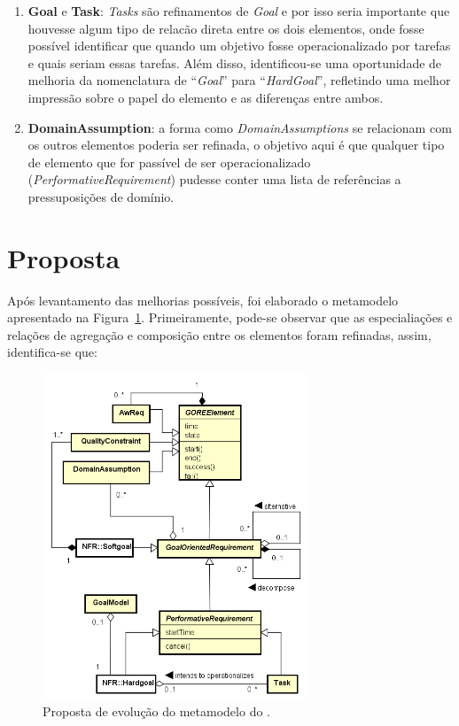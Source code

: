 \begin{enumerate}
	\item \textbf{Goal} e \textbf{Task}: \textit{Tasks} são refinamentos de \textit{Goal} e por isso seria importante que houvesse algum tipo de relacão direta entre os dois elementos, onde fosse possível identificar que quando um objetivo fosse operacionalizado por tarefas e quais seriam essas tarefas. Além disso, identificou-se uma oportunidade de melhoria da nomenclatura de ``\textit{Goal}'' para ``\textit{HardGoal}'', refletindo uma melhor impressão sobre o papel do elemento e as diferenças entre ambos. \label{p5}
	
	\item \textbf{DomainAssumption}: a forma como \textit{DomainAssumptions} se relacionam com os outros elementos poderia ser refinada, o objetivo aqui é que qualquer tipo de elemento que for passível de ser operacionalizado (\textit{PerformativeRequirement}) pudesse conter uma lista de referências a pressuposições de domínio. \label{p6}
\end{enumerate}

\section{Proposta}
\label{sec-zanshin-proposta}

Após levantamento das melhorias possíveis, foi elaborado o metamodelo apresentado na Figura~\ref{figura-metamodelo-novo}. Primeiramente, pode-se observar que as especialiações e relações de agregação e composição entre os elementos foram refinadas, assim, identifica-se que:

\begin{figure}
	\centering
	\includegraphics[width=0.7\textwidth]{figuras/metamodelos/metamodelo-zanshin-novo.png}
	\caption{Proposta de evolução do metamodelo do \framework \zanshin.}
	\label{figura-metamodelo-novo}
\end{figure}

